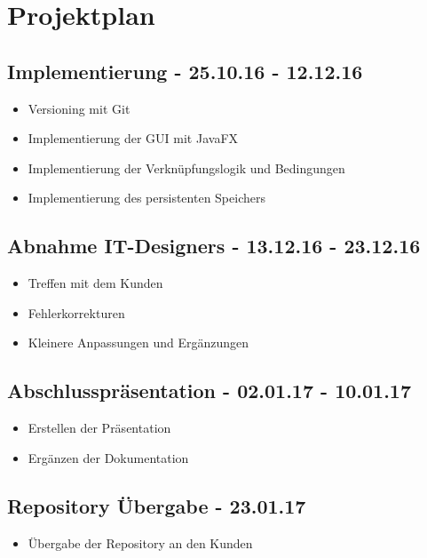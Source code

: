 
\section{Projektplan}
\subsection{Implementierung - 25.10.16 - 12.12.16}
\begin{itemize}
\item Versioning mit Git
\item Implementierung der GUI mit JavaFX
\item Implementierung der Verknüpfungslogik und Bedingungen
\item Implementierung des persistenten Speichers
\end{itemize}

\subsection{Abnahme IT-Designers - 13.12.16 - 23.12.16}
\begin{itemize}
\item Treffen mit dem Kunden
\item Fehlerkorrekturen
\item Kleinere Anpassungen und Ergänzungen
\end{itemize}

\subsection{Abschlusspräsentation - 02.01.17 - 10.01.17}
\begin{itemize}
\item Erstellen der Präsentation
\item Ergänzen der Dokumentation
\end{itemize}

\subsection{Repository Übergabe - 23.01.17}
\begin{itemize}
\item Übergabe der Repository an den Kunden
\end{itemize}